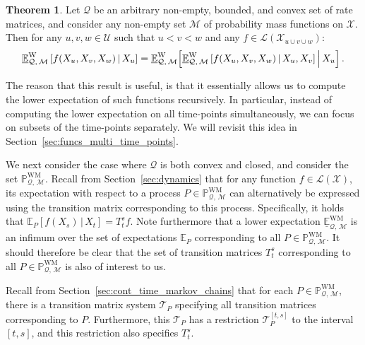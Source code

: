 \documentclass[10pt,a4paper]{paper}
\theoremstyle{definition}
\newtheorem{theorem}{Theorem}[section]
\newcommand{\states}{\mathcal{X}}
\newcommand{\processes}{\mathbb{P}}
\newcommand{\wmprocesses}{\processes^{\mathrm{WM}}}
\newcommand{\gambles}{\mathcal{L}}
\newcommand{\gamblesX}{\gambles(\states)}
\newcommand{\rateset}{\mathcal{Q}}
\begin{document}
\begin{theorem}\label{theorem:decomposition_multivar}
Let $\rateset$ be an arbitrary non-empty, bounded, and convex set of rate matrices, and consider any non-empty set $\mathcal{M}$ of probability mass functions on $\states$. Then for any $u,v,w\in\mathcal{U}$ such that $u<v<w$ and any $f\in\gambles(\states_{u\cup v\cup w})$:
\begin{equation}\label{eq:lower_exp_factorizes}
\underline{\mathbb{E}}^{\mathrm{W}}_{\rateset,\,\mathcal{M}}\left[f(X_u,X_v,X_w)\,\vert\,X_u\right] = \underline{\mathbb{E}}^{\mathrm{W}}_{\rateset,\,\mathcal{M}}\Bigl[\underline{\mathbb{E}}^{\mathrm{W}}_{\rateset,\,\mathcal{M}}\left[f(X_u,X_v,X_w)\,\vert\,X_u,X_v\right] \Big\vert\,X_u\Bigr]\,. 
\end{equation}
\end{theorem}
The reason that this result is useful, is that it essentially allows us to compute the lower expectation of such functions recursively. In particular, instead of computing the lower expectation on all time-points simultaneously, we can focus on subsets of the time-points separately. We will revisit this idea in Section~\ref{sec:funcs_multi_time_points}.

We next consider the case where $\rateset$ is both convex and closed, and consider the set $\wmprocesses_{\rateset,\,\mathcal{M}}$. Recall from Section~\ref{sec:dynamics} that for any function $f\in\gamblesX$, its expectation with respect to a process $P\in\wmprocesses_{\rateset,\,\mathcal{M}}$ can alternatively be expressed using the transition matrix corresponding to this process. Specifically, it holds that $\mathbb{E}_P[f(X_s)\,\vert\,X_t]=T_t^sf$. Note furthermore that a lower expectation $\underline{\mathbb{E}}_{\rateset,\,\mathcal{M}}^{\mathrm{WM}}$ is an infimum over the set of expectations $\mathbb{E}_P$ corresponding to all $P\in\wmprocesses_{\rateset,\,\mathcal{M}}$. It should therefore be clear that the set of transition matrices $T_t^s$ corresponding to all $P\in\wmprocesses_{\rateset,\,\mathcal{M}}$ is also of interest to us.

Recall from Section~\ref{sec:cont_time_markov_chains} that for each $P\in\wmprocesses_{\rateset,\,\mathcal{M}}$, there is a transition matrix system $\mathcal{T}_P$ specifying all transition matrices corresponding to $P$. Furthermore, this $\mathcal{T}_P$ has a restriction $\mathcal{T}_P^{[t,s]}$ to the interval $[t,s]$, and this restriction also specifies $T_t^s$. 
\end{document}
